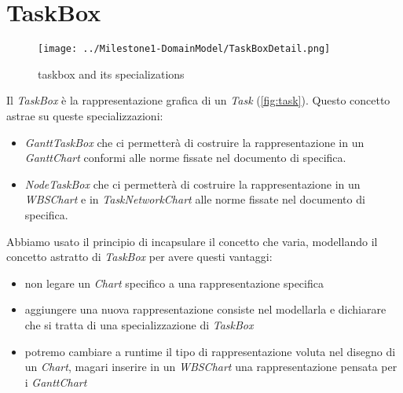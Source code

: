 \section{TaskBox}
\label{sec:taskbox}

\begin{figure}[h!] 
	\centering
	\texttt{[image: ../Milestone1-DomainModel/TaskBoxDetail.png]}
	\caption{taskbox and its specializations}
	\label{fig:taskbox} 
\end{figure}

Il \emph{TaskBox} \`e la rappresentazione grafica di un
\emph{Task} (\autoref{fig:task}). Questo concetto astrae su queste
specializzazioni:
\begin{itemize}
\item \emph{GanttTaskBox} che ci permetter\`a di costruire la rappresentazione
in un \emph{GanttChart} conformi alle norme fissate nel documento di specifica.

\item \emph{NodeTaskBox} che ci permetter\`a di costruire la rappresentazione
in un \emph{WBSChart} e in \emph{TaskNetworkChart} alle norme fissate nel 
documento di specifica.
\end{itemize}

Abbiamo usato il principio di incapsulare il concetto che varia, modellando il
concetto astratto di \emph{TaskBox} per avere questi vantaggi:
\begin{itemize}
  \item non legare un \emph{Chart} specifico a una rappresentazione specifica
  \item aggiungere una nuova rappresentazione consiste nel modellarla e
  dichiarare che si tratta di una specializzazione di \emph{TaskBox}
  \item potremo cambiare a runtime il tipo di rappresentazione voluta nel
  disegno di un \emph{Chart}, magari inserire in un \emph{WBSChart} una
  rappresentazione pensata per i \emph{GanttChart}
\end{itemize}